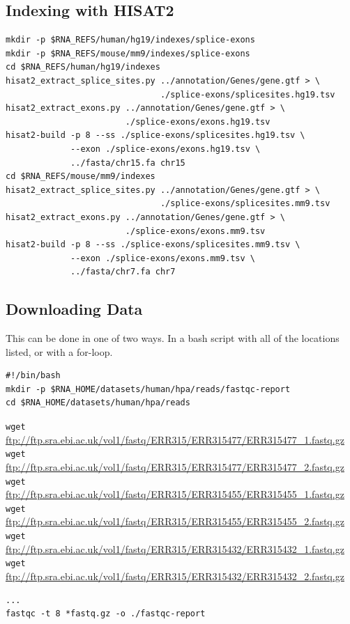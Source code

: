 \subsection{Indexing with HISAT2}
\begin{verbatim}
mkdir -p $RNA_REFS/human/hg19/indexes/splice-exons
mkdir -p $RNA_REFS/mouse/mm9/indexes/splice-exons
cd $RNA_REFS/human/hg19/indexes
hisat2_extract_splice_sites.py ../annotation/Genes/gene.gtf > \
                               ./splice-exons/splicesites.hg19.tsv
hisat2_extract_exons.py ../annotation/Genes/gene.gtf > \
                        ./splice-exons/exons.hg19.tsv
hisat2-build -p 8 --ss ./splice-exons/splicesites.hg19.tsv \
             --exon ./splice-exons/exons.hg19.tsv \
             ../fasta/chr15.fa chr15
cd $RNA_REFS/mouse/mm9/indexes
hisat2_extract_splice_sites.py ../annotation/Genes/gene.gtf > \
                               ./splice-exons/splicesites.mm9.tsv
hisat2_extract_exons.py ../annotation/Genes/gene.gtf > \
                        ./splice-exons/exons.mm9.tsv
hisat2-build -p 8 --ss ./splice-exons/splicesites.mm9.tsv \
             --exon ./splice-exons/exons.mm9.tsv \
             ../fasta/chr7.fa chr7
\end{verbatim}

\subsection{Downloading Data}
This can be done in one of two ways. In a bash script with all of the locations listed, or with a for-loop.

\begin{verbatim}
#!/bin/bash
mkdir -p $RNA_HOME/datasets/human/hpa/reads/fastqc-report
cd $RNA_HOME/datasets/human/hpa/reads
\end{verbatim}

\noindent\texttt{wget} \url{ftp://ftp.sra.ebi.ac.uk/vol1/fastq/ERR315/ERR315477/ERR315477_1.fastq.gz}\\
\texttt{wget} \url{ftp://ftp.sra.ebi.ac.uk/vol1/fastq/ERR315/ERR315477/ERR315477_2.fastq.gz}\\
\texttt{wget} \url{ftp://ftp.sra.ebi.ac.uk/vol1/fastq/ERR315/ERR315455/ERR315455_1.fastq.gz}\\
\texttt{wget} \url{ftp://ftp.sra.ebi.ac.uk/vol1/fastq/ERR315/ERR315455/ERR315455_2.fastq.gz}\\
\texttt{wget} \url{ftp://ftp.sra.ebi.ac.uk/vol1/fastq/ERR315/ERR315432/ERR315432_1.fastq.gz}\\
\texttt{wget} \url{ftp://ftp.sra.ebi.ac.uk/vol1/fastq/ERR315/ERR315432/ERR315432_2.fastq.gz}\\
\begin{verbatim}
...
fastqc -t 8 *fastq.gz -o ./fastqc-report
\end{verbatim}

